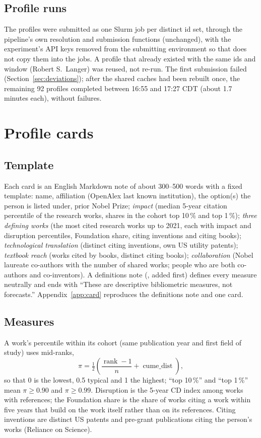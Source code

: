 \documentclass[11pt]{article}
\newcommand{\code}[1]{\texttt{\detokenize{#1}}}
\begin{document}
\subsection{Profile runs}

The profiles were submitted as one Slurm job per distinct id set, through the pipeline's own resolution and submission
functions (unchanged), with the experiment's API keys removed from the submitting environment so that
\code{sbatch --export=ALL} does not copy them into the jobs. A profile that already existed with the same ids and window
(Robert S.\ Langer) was reused, not re-run. The first submission failed (Section~\ref{sec:deviations}); after the shared
caches had been rebuilt once, the remaining 92 profiles completed between 16:55 and 17:27 CDT (about 1.7 minutes each),
without failures.
\section{Profile cards}\label{sec:cards}

\subsection{Template}

Each card is an English Markdown note of about 300--500 words with a fixed template: name, affiliation (OpenAlex last
known institution), the option(s) the person is listed under, prior Nobel Prize; \emph{impact} (median 5-year citation
percentile of the research works, shares in the cohort top 10\,\% and top 1\,\%); \emph{three defining works} (the most
cited research works up to 2021, each with impact and disruption percentiles, Foundation share, citing inventions and
citing books); \emph{technological translation} (distinct citing inventions, own US utility patents); \emph{textbook
reach} (works cited by books, distinct citing books); \emph{collaboration} (Nobel laureate co-authors with the number of
shared works; people who are both co-authors and co-inventors). A definitions note (\code{00_definitions.md}, added
first) defines every measure neutrally and ends with ``These are descriptive bibliometric measures, not forecasts.''
Appendix~\ref{app:card} reproduces the definitions note and one card.

\subsection{Measures}

A work's percentile within its cohort (same publication year and first field of study) uses mid-ranks,
\begin{equation}
\pi=\tfrac12\left(\frac{\operatorname{rank}-1}{n}+\operatorname{cume\_dist}\right),
\end{equation}
so that 0 is the lowest, 0.5 typical and 1 the highest; ``top 10\,\%'' and ``top 1\,\%'' mean $\pi\ge0.90$ and
$\pi\ge0.99$. Disruption is the 5-year CD index among works with references; the Foundation share is the share of works
citing a work within five years that build on the work itself rather than on its references. Citing inventions are
distinct US patents and pre-grant publications citing the person's works (Reliance on Science).
\end{document}
